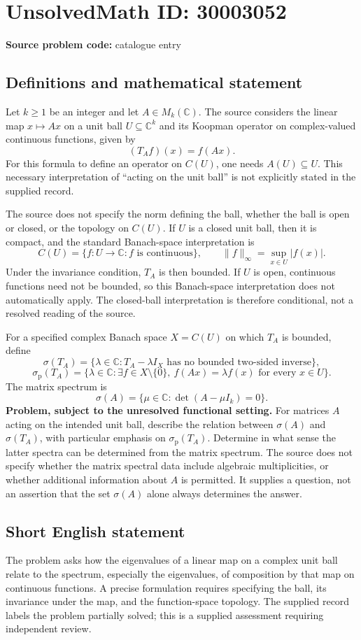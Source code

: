 \documentclass[11pt]{article}
\newcommand{\C}{\mathbb{C}}
\begin{document}
\section*{UnsolvedMath ID: 30003052}
\textbf{Source problem code:} catalogue entry
\subsection{Definitions and mathematical statement}
Let \(k\geq 1\) be an integer and let \(A\in M_k(\C)\). The source considers the linear map \(x\mapsto Ax\) on a unit ball \(U\subseteq\C^k\) and its Koopman operator on complex-valued continuous functions, given by
\[
(T_Af)(x)=f(Ax).
\]
For this formula to define an operator on \(C(U)\), one needs \(A(U)\subseteq U\). This necessary interpretation of ``acting on the unit ball'' is not explicitly stated in the supplied record.

The source does not specify the norm defining the ball, whether the ball is open or closed, or the topology on \(C(U)\). If \(U\) is a closed unit ball, then it is compact, and the standard Banach-space interpretation is
\[
C(U)=\{f:U\to\C: f\text{ is continuous}\},\qquad
\|f\|_\infty=\sup_{x\in U}|f(x)|.
\]
Under the invariance condition, \(T_A\) is then bounded. If \(U\) is open, continuous functions need not be bounded, so this Banach-space interpretation does not automatically apply. The closed-ball interpretation is therefore conditional, not a resolved reading of the source.

For a specified complex Banach space \(X=C(U)\) on which \(T_A\) is bounded, define
\[
\sigma(T_A)=\{\lambda\in\C:T_A-\lambda I_X\text{ has no bounded two-sided inverse}\},
\]
\[
\sigma_{\mathrm p}(T_A)=\{\lambda\in\C:\exists f\in X\setminus\{0\},\ f(Ax)=\lambda f(x)\text{ for every }x\in U\}.
\]
The matrix spectrum is
\[
\sigma(A)=\{\mu\in\C:\det(A-\mu I_k)=0\}.
\]
\textbf{Problem, subject to the unresolved functional setting.} For matrices \(A\) acting on the intended unit ball, describe the relation between \(\sigma(A)\) and \(\sigma(T_A)\), with particular emphasis on \(\sigma_{\mathrm p}(T_A)\). Determine in what sense the latter spectra can be determined from the matrix spectrum. The source does not specify whether the matrix spectral data include algebraic multiplicities, or whether additional information about \(A\) is permitted. It supplies a question, not an assertion that the set \(\sigma(A)\) alone always determines the answer.
\subsection{Short English statement}
The problem asks how the eigenvalues of a linear map on a complex unit ball relate to the spectrum, especially the eigenvalues, of composition by that map on continuous functions. A precise formulation requires specifying the ball, its invariance under the map, and the function-space topology. The supplied record labels the problem partially solved; this is a supplied assessment requiring independent review.
\end{document}
